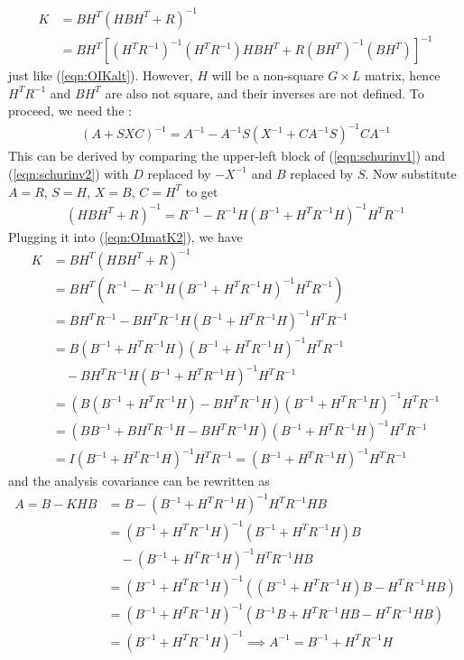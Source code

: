 \begin{align*}
K &= BH^T(HBH^T+R)^{-1} \\
&= BH^T[(H^TR^{-1})^{-1}(H^TR^{-1})HBH^T+R(BH^T)^{-1}(BH^T)]^{-1} 
\end{align*}
just like (\ref{eqn:OIKalt}). However, $H$ will be a non-square $G \times L$ matrix, hence $H^TR^{-1}$ and $BH^T$ are also not square, and their inverses are not defined. To proceed, we need the :
\begin{align}
(A + SXC)^{-1} = A^{-1} - A^{-1}S(X^{-1} + CA^{-1}S)^{-1}CA^{-1}
\end{align}
This can be derived by comparing the upper-left block of (\ref{eqn:schurinv1}) and (\ref{eqn:schurinv2}) with $D$ replaced by $-X^{-1}$ and $B$ replaced by $S$. Now substitute $A = R$, $S = H$, $X = B$, $C=H^T$ to get
\begin{align}
(HBH^T + R)^{-1} = R^{-1} - R^{-1}H(B^{-1} + H^TR^{-1}H)^{-1}H^T R^{-1}    
\end{align}
Plugging it into (\ref{eqn:OImatK2}), we have
\begin{align}
K &= BH^T(HBH^T+R)^{-1} \nonumber \\
&= BH^T(R^{-1} - R^{-1}H(B^{-1} + H^TR^{-1}H)^{-1}H^T R^{-1}) \nonumber \\
&= BH^TR^{-1} - BH^TR^{-1}H(B^{-1} + H^TR^{-1}H)^{-1}H^T R^{-1} \nonumber \\
&= B(B^{-1} + H^TR^{-1}H)(B^{-1} + H^TR^{-1}H)^{-1}H^TR^{-1} \nonumber \\
&\quad- BH^TR^{-1}H(B^{-1} + H^TR^{-1}H)^{-1}H^T R^{-1} \nonumber \\
&= (B(B^{-1} + H^TR^{-1}H) - BH^TR^{-1}H)(B^{-1} + H^TR^{-1}H)^{-1}H^TR^{-1} \nonumber \\
&= (BB^{-1} + BH^TR^{-1}H - BH^TR^{-1}H)(B^{-1} + H^TR^{-1}H)^{-1}H^TR^{-1} \nonumber \\
&= I(B^{-1} + H^TR^{-1}H)^{-1}H^TR^{-1} = (B^{-1} + H^TR^{-1}H)^{-1}H^TR^{-1}
\end{align}
and the analysis covariance can be rewritten as
\begin{align}
A = B - KHB &= B - (B^{-1} + H^TR^{-1}H)^{-1}H^TR^{-1}HB \nonumber \\
&= (B^{-1} + H^TR^{-1}H)^{-1}(B^{-1} + H^TR^{-1}H)B \nonumber \\
&\quad- (B^{-1} + H^TR^{-1}H)^{-1}H^TR^{-1}HB \nonumber \\
&= (B^{-1} + H^TR^{-1}H)^{-1}((B^{-1} + H^TR^{-1}H)B - H^TR^{-1}HB) \nonumber \\
&= (B^{-1} + H^TR^{-1}H)^{-1}(B^{-1}B + H^TR^{-1}HB - H^TR^{-1}HB) \nonumber \\
&= (B^{-1} + H^TR^{-1}H)^{-1} \implies A^{-1} = B^{-1} + H^TR^{-1}H
\end{align}

